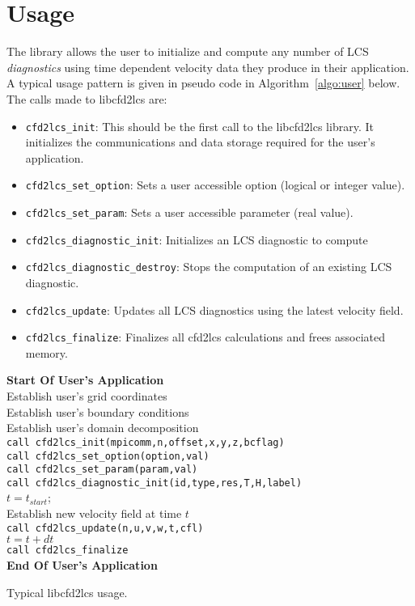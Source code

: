 \documentclass[letterpaper,11pt]{article}
\begin{document}
\section{Usage}
The library allows the user to initialize and compute any number of LCS \emph{diagnostics} using time dependent velocity data they produce in their application.  A typical usage pattern is given in pseudo code in Algorithm~\ref{algo:user} below.  The calls made to libcfd2lcs are:
\begin{itemize}
 \item \verb|cfd2lcs_init|:  This should be the first call to the libcfd2lcs library.  It initializes the communications and data storage required for the user's application.
 \item \verb|cfd2lcs_set_option|: Sets a user accessible option (logical or integer value).
 \item \verb|cfd2lcs_set_param|: Sets a user accessible parameter (real value).
 \item \verb|cfd2lcs_diagnostic_init|:  Initializes an LCS diagnostic to compute
 \item \verb|cfd2lcs_diagnostic_destroy|:  Stops the computation of an existing LCS diagnostic.
 \item \verb|cfd2lcs_update|:  Updates all LCS diagnostics using the latest velocity field.
 \item \verb|cfd2lcs_finalize|:  Finalizes all cfd2lcs calculations and frees associated memory.
\end{itemize}
\begin{algorithm}[!htbp!]
\DontPrintSemicolon 
{\bf Start Of User's Application}\\
Establish user's grid coordinates \\
Establish user's boundary conditions\\
Establish user's domain decomposition\\
\verb|call cfd2lcs_init(mpicomm,n,offset,x,y,z,bcflag)|\\
\verb|call cfd2lcs_set_option(option,val)| \\
\verb|call cfd2lcs_set_param(param,val)| \\ 
\verb|call cfd2lcs_diagnostic_init(id,type,res,T,H,label)| \\
$t=t_{start}$;\\
 {
Establish new velocity field at time $t$\\
\texttt{call cfd2lcs\_update(n,u,v,w,t,cfl)}\\

$t = t+dt$\\
}
\verb|call cfd2lcs_finalize| \\
{\bf End Of User's Application}
\caption{Typical libcfd2lcs usage.}
\label{algo:user}
\end{algorithm}
\end{document}
